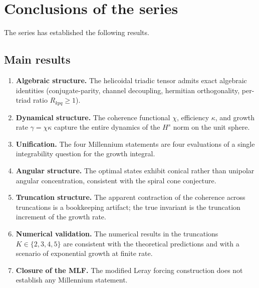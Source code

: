 \section{Conclusions of the series}
\label{part-6:sec:conclusions-series}

The series has established the following results.

\subsection{Main results}
\label{part-6:ssec:main-results}

\begin{enumerate}[label=(\Alph*),leftmargin=*]
\item \textbf{Algebraic structure.} The helicoidal triadic tensor 
      admits exact algebraic identities (conjugate-parity, channel 
      decoupling, hermitian orthogonality, per-triad ratio 
      $R_{kpq}\geq 1$).

\item \textbf{Dynamical structure.} The coherence functional $\chi$, 
      efficiency $\kappa$, and growth rate $\gamma = \chi\kappa$ 
      capture the entire dynamics of the $H^s$ norm on the unit 
      sphere.

\item \textbf{Unification.} The four Millennium statements are 
      four evaluations of a single integrability question for the 
      growth integral.

\item \textbf{Angular structure.} The optimal states exhibit 
      conical rather than unipolar angular concentration, 
      consistent with the spiral cone conjecture.

\item \textbf{Truncation structure.} The apparent contraction of 
      the coherence across truncations is a bookkeeping artifact; 
      the true invariant is the truncation increment of the 
      growth rate.

\item \textbf{Numerical validation.} The numerical results in the 
      truncations $K\in\{2,3,4,5\}$ are consistent with the 
      theoretical predictions and with a scenario of exponential 
      growth at finite rate.

\item \textbf{Closure of the MLF.} The modified Leray forcing 
      construction does not establish any Millennium statement.
\end{enumerate}

